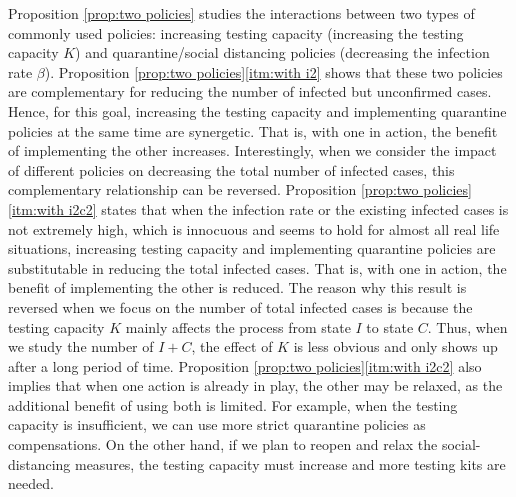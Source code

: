 \documentclass[nonblindrev, copyedit]{informs3a}
\newcounter{prop}[chapter]
\begin{document}
Proposition \ref{prop:two policies} studies the interactions between two types of commonly used policies: increasing testing capacity (increasing the testing capacity $K$) and quarantine/social distancing policies (decreasing the infection rate $\beta$). 
Proposition \ref{prop:two policies}\eqref{itm:with i2} shows that these two policies are complementary for reducing the number of infected but unconfirmed cases. Hence, for this goal, increasing the testing capacity and implementing quarantine policies at the same time are synergetic. That is, with one in action, the benefit of implementing the other increases.  
Interestingly, when we consider the impact of different policies on decreasing the total number of infected cases, this complementary relationship can be reversed. Proposition \ref{prop:two policies}\eqref{itm:with i2c2} states that when the infection rate or the existing infected cases is not extremely high, which is innocuous and seems to hold for almost all real life situations, increasing testing capacity and implementing quarantine policies are substitutable in reducing the total infected cases. That is, with one in action, the benefit of implementing the other is reduced. 
The reason why this result is reversed when we focus on the number of total infected cases is because the testing capacity $K$ mainly affects the process from state $I$ to state $C$. Thus, when we study the number of $I+C$, the effect of $K$ is less obvious and only shows up after a long period of time.
Proposition \ref{prop:two policies}\eqref{itm:with i2c2} also implies that when one action is already in play, the other may be relaxed, as the additional benefit of using both is limited. For example, when the testing capacity is insufficient, we can use more strict quarantine policies as compensations. On the other hand, if we plan to reopen and relax the social-distancing measures, the testing capacity must increase and more testing kits are needed.
\end{document}
